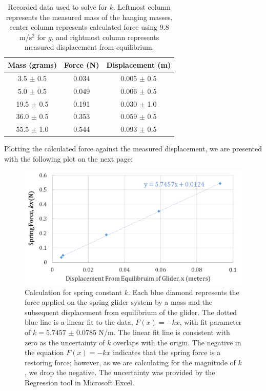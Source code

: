 \documentclass[titlepage]{article}
\begin{document}
\begin{table}[!htbp]
\renewcommand{\arraystretch}{1.3}
\centering
\begin{tabular}{c|c|c}
    \hline
    \hline
    Mass (grams) & Force (N) & Displacement (m)\\
    \hline
    \hline

    3.5 $\pm$ 0.5    &  0.034 &  0.005 $\pm$ 0.5\\
    \hline

    5.0 $\pm$ 0.5    &  0.049 &  0.006 $\pm$ 0.5\\
    \hline

    19.5 $\pm$ 0.5   &  0.191 &  0.030 $\pm$ 1.0\\
    \hline

    36.0 $\pm$ 0.5   &  0.353 &  0.059 $\pm$ 0.5\\
    \hline

    55.5 $\pm$ 1.0  &  0.544 &  0.093 $\pm$ 0.5\\
    \hline
\end{tabular}
\caption{Recorded data used to solve for $k$. Leftmost column represents the measured mass of the hanging masses, center column represents calculated force using 9.8 m/s$^2$ for $g$, and rightmost column represents measured displacement from equilibrium.}
\end{table}

Plotting the calculated force against the measured displacement, we are presented with the following plot on the next page:

\pagebreak

\begin{figure}[!htbp]
    \centering
    \includegraphics[width=5.0in]{SpringForce.png}
    \caption{Calculation for spring constant $k$. Each blue diamond represents the force applied on the spring glider system by a mass and the subsequent displacement from equilibrium of the glider. The dotted blue line is a linear fit to the data, $F(x) = -kx$, with fit parameter of $k = 5.7457$ $\pm$ 0.0785 N/m. The linear fit line is consistent with zero as the uncertainty of $k$ overlaps with the origin. The negative in the equation $F(x) = -kx$ indicates that the spring force is a restoring force; however, as we are calculating for the magnitude of $k$, we drop the negative. The uncertainty was provided by the Regression tool in Microsoft Excel.}
\end{figure}
\end{document}
